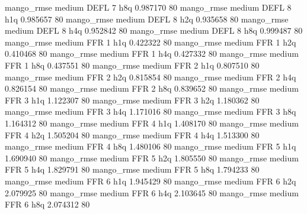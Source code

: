        mango_rmse     medium     DEFL                 7                  h8q  0.987170 80
       mango_rmse     medium     DEFL                 8                  h1q  0.985657 80
       mango_rmse     medium     DEFL                 8                  h2q  0.935658 80
       mango_rmse     medium     DEFL                 8                  h4q  0.952842 80
       mango_rmse     medium     DEFL                 8                  h8q  0.999487 80
       mango_rmse     medium      FFR                 1                  h1q  0.422322 80
       mango_rmse     medium      FFR                 1                  h2q  0.410468 80
       mango_rmse     medium      FFR                 1                  h4q  0.427332 80
       mango_rmse     medium      FFR                 1                  h8q  0.437551 80
       mango_rmse     medium      FFR                 2                  h1q  0.807510 80
       mango_rmse     medium      FFR                 2                  h2q  0.815854 80
       mango_rmse     medium      FFR                 2                  h4q  0.826154 80
       mango_rmse     medium      FFR                 2                  h8q  0.839652 80
       mango_rmse     medium      FFR                 3                  h1q  1.122307 80
       mango_rmse     medium      FFR                 3                  h2q  1.180362 80
       mango_rmse     medium      FFR                 3                  h4q  1.171016 80
       mango_rmse     medium      FFR                 3                  h8q  1.164312 80
       mango_rmse     medium      FFR                 4                  h1q  1.408170 80
       mango_rmse     medium      FFR                 4                  h2q  1.505204 80
       mango_rmse     medium      FFR                 4                  h4q  1.513300 80
       mango_rmse     medium      FFR                 4                  h8q  1.480106 80
       mango_rmse     medium      FFR                 5                  h1q  1.690940 80
       mango_rmse     medium      FFR                 5                  h2q  1.805550 80
       mango_rmse     medium      FFR                 5                  h4q  1.829791 80
       mango_rmse     medium      FFR                 5                  h8q  1.794233 80
       mango_rmse     medium      FFR                 6                  h1q  1.945429 80
       mango_rmse     medium      FFR                 6                  h2q  2.079925 80
       mango_rmse     medium      FFR                 6                  h4q  2.103645 80
       mango_rmse     medium      FFR                 6                  h8q  2.074312 80
